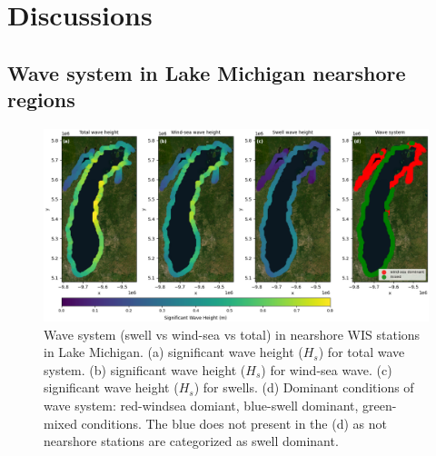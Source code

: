 \section{Discussions}
\label{c4_Discussions}

\subsection{Wave system in Lake Michigan nearshore regions}
\label{Wave system in Lake Michigan nearshore regions}

\begin{figure}[htbp]
  \centering
  \includegraphics[width=1\textwidth]{chapter4/resources/nearshore_system_climate.png}
  \caption{Wave system (swell vs wind-sea vs total) in nearshore WIS stations in
  Lake Michigan. (a) significant wave height ($H_s$) for total wave system. (b)
  significant wave height ($H_s$) for wind-sea wave. (c) significant wave height
  ($H_s$) for swells. (d) Dominant conditions of wave system: red-windsea
  domiant, blue-swell dominant, green-mixed conditions. The blue does not
  present in the (d) as not nearshore stations are categorized as swell
  dominant.}
  \label{fig:nearshore_system}
\end{figure}

